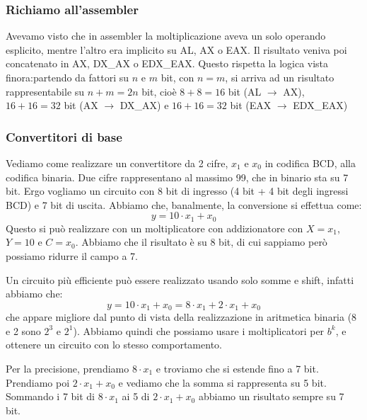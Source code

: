\documentclass[a4paper,11pt]{article}
\begin{document}
\subsubsection{Richiamo all'assembler}
Avevamo visto che in assembler la moltiplicazione aveva un solo operando esplicito, mentre l'altro era implicito su AL, AX o EAX.
Il risultato veniva poi concatenato in AX, DX\_AX o EDX\_EAX.
Questo rispetta la logica vista finora:partendo da fattori su $n$ e $m$ bit, con $n = m$, si arriva ad un risultato rappresentabile su $n + m = 2n$ bit, cioè $8 + 8 = 16$ bit (AL $\rightarrow$ AX), $16 + 16 = 32$ bit (AX $\rightarrow$ DX\_AX) e $16 + 16 = 32$ bit (EAX $\rightarrow$ EDX\_EAX)

\subsubsection{Convertitori di base}
Vediamo come realizzare un convertitore da 2 cifre, $x_1$ e $x_0$ in codifica BCD, alla codifica binaria.
Due cifre rappresentano al massimo 99, che in binario sta su 7 bit.
Ergo vogliamo un circuito con 8 bit di ingresso (4 bit + 4 bit degli ingressi BCD) e 7 bit di uscita.
Abbiamo che, banalmente, la conversione si effettua come:
$$
y = 10 \cdot x_1 + x_0 
$$
Questo si può realizzare con un moltiplicatore con addizionatore con $X=x_1$, $Y=10$ e $C=x_0$.
Abbiamo che il risultato è su 8 bit, di cui sappiamo però possiamo ridurre il campo a 7.
\par\smallskip 
Un circuito più efficiente può essere realizzato usando solo somme e shift, infatti abbiamo che:
$$ y = 10 \cdot x_1 + x_ 0 = 8 \cdot x_1 + 2 \cdot x_1 + x_0 $$
che appare migliore dal punto di vista della realizzazione in aritmetica binaria (8 e 2 sono $2^3$ e $2^1$).
Abbiamo quindi che possiamo usare i moltiplicatori per $b^k$, e ottenere un circuito con lo stesso comportamento.

Per la precisione, prendiamo $8 \cdot x_1$ e troviamo che si estende fino a 7 bit.
Prendiamo poi  $2 \cdot x_1 + x_0$ e vediamo che la somma si rappresenta su 5 bit.
Sommando i 7 bit di $8 \cdot x_1$ ai 5 di $2 \cdot x_1 + x_0$ abbiamo un risultato sempre su 7 bit.
\end{document}
